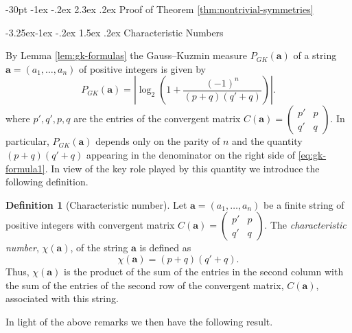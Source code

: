 \documentclass[10pt]{article}
\makeatletter
\renewcommand\section{\@startsection {section}{1}{\z@}
{-30pt \@plus -1ex \@minus -.2ex}
{2.3ex \@plus.2ex}
{\normalfont\normalsize\bfseries\boldmath}}
\renewcommand\subsection{\@startsection{subsection}{2}{\z@}
{-3.25ex\@plus -1ex \@minus -.2ex}
{1.5ex \@plus .2ex}
{\normalfont\normalsize\bfseries\boldmath}}
\theoremstyle{definition}
\newtheorem{definition}[lemma]{Definition}
\numberwithin{equation}{section}
\numberwithin{lemma}{section}
\newcommand{\bfa}{\mathbf{a}}
\makeatother
\begin{document}

\section{Proof of Theorem 
\protect
\ref{thm:nontrivial-symmetries}}

\label{sec:thm3proof}


\subsection{Characteristic Numbers}

By Lemma \ref{lem:gk-formulas} the Gauss--Kuzmin measure $P_{GK}(\bfa)$
of a  string $\bfa=(a_1,\dots,a_n)$ of positive integers 
is given by
\begin{equation}
\label{eq:gk-formula1}
P_{GK}(\bfa)
= \left|\log_2\left(1+\frac{(-1)^n}{(p+q)(q'+q)}\right)\right|.
\end{equation}
where $p',q',p,q$ are the entries of the convergent
matrix 
$C(\bfa)=\left(\begin{smallmatrix} p'&p\\q'&q\end{smallmatrix}\right)$.
In particular, $P_{GK}(\bfa)$ depends only on the parity of $n$ and
the quantity $(p+q)(q'+q)$ appearing in the denominator on the right 
side of \eqref{eq:gk-formula1}.   In view of the key role played by this
quantity we introduce the following definition.

\begin{definition}[Characteristic number]
\label{def:char-number}
Let $\bfa=(a_1,\dots,a_n)$ be a finite string of positive integers with 
convergent matrix 
$C(\bfa)=\left(\begin{smallmatrix} p'&p\\q'&q\end{smallmatrix}\right)$.
The \emph{characteristic number}, $\chi(\bfa)$, 
of the string $\bfa$ is defined as  
\begin{equation}
\label{eq:char-number-def}
\chi(\bfa)=(p+q)(q'+q).
\end{equation}
Thus, $\chi(\bfa)$ is the product of the sum of the entries in
the second column with the sum of the entries of the second row of the
convergent matrix, $C(\bfa)$, associated with this string.
\end{definition}


In light of the above remarks we then have the following result.
\end{document}
